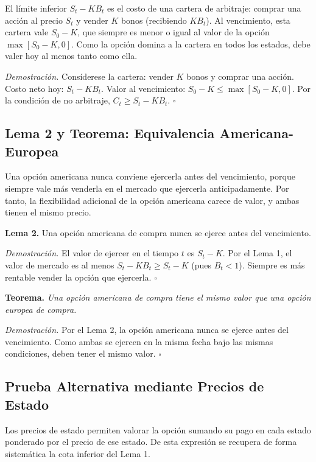 \documentclass[12pt]{article}
\begin{document}
\begin{intuicionmat}
El l\'imite inferior $S_t - KB_t$ es el costo de una cartera de arbitraje: comprar una acci\'on al precio $S_t$ y vender $K$ bonos (recibiendo $KB_t$). Al vencimiento, esta cartera vale $S_0 - K$, que siempre es menor o igual al valor de la opci\'on $\max[S_0 - K, 0]$. Como la opci\'on domina a la cartera en todos los estados, debe valer hoy al menos tanto como ella.
\end{intuicionmat}

\textit{Demostraci\'on.} Cons\'iderese la cartera: vender $K$ bonos y comprar una acci\'on. Costo neto hoy: $S_t - KB_t$. Valor al vencimiento: $S_0 - K \leq \max[S_0 - K, 0]$. Por la condici\'on de no arbitraje, $C_t \geq S_t - KB_t$. $\square$

\subsection{Lema 2 y Teorema: Equivalencia Americana-Europea}

\begin{intuicion}
Una opci\'on americana nunca conviene ejercerla antes del vencimiento, porque siempre vale m\'as venderla en el mercado que ejercerla anticipadamente. Por tanto, la flexibilidad adicional de la opci\'on americana carece de valor, y ambas tienen el mismo precio.
\end{intuicion}

\textbf{Lema 2.} Una opci\'on americana de compra nunca se ejerce antes del vencimiento.

\textit{Demostraci\'on.} El valor de ejercer en el tiempo $t$ es $S_t - K$. Por el Lema 1, el valor de mercado es al menos $S_t - KB_t \geq S_t - K$ (pues $B_t < 1$). Siempre es m\'as rentable vender la opci\'on que ejercerla. $\square$

\textbf{Teorema.} \textit{Una opci\'on americana de compra tiene el mismo valor que una opci\'on europea de compra.}

\textit{Demostraci\'on.} Por el Lema 2, la opci\'on americana nunca se ejerce antes del vencimiento. Como ambas se ejercen en la misma fecha bajo las mismas condiciones, deben tener el mismo valor. $\square$

\subsection{Prueba Alternativa mediante Precios de Estado}

\begin{intuicion}
Los precios de estado permiten valorar la opci\'on sumando su pago en cada estado ponderado por el precio de ese estado. De esta expresi\'on se recupera de forma sistem\'atica la cota inferior del Lema 1.
\end{intuicion}
\end{document}
